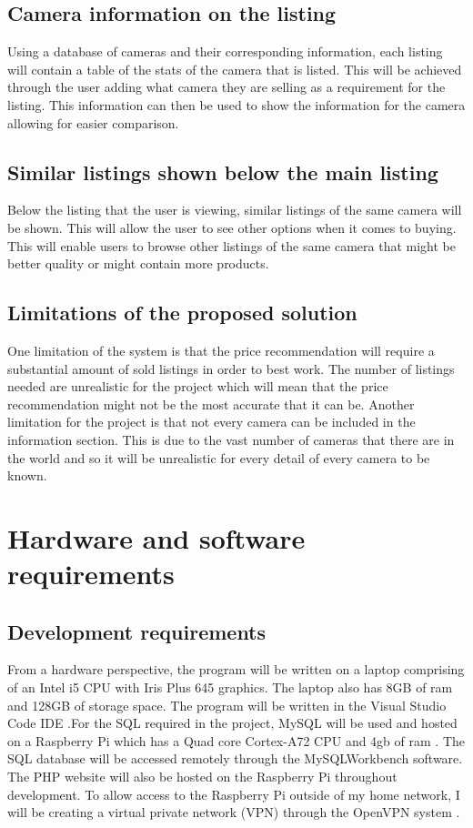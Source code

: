 \subsection{Camera information on the listing}
Using a database of cameras and their corresponding information, each listing will contain a table of the stats of the camera that is listed. This will be achieved through the user adding what camera they are selling as a requirement for the listing. This information can then be used to show the information for the camera allowing for easier comparison.
\subsection{Similar listings shown below the main listing}
Below the listing that the user is viewing, similar listings of the same camera will be shown. This will allow the user to see other options when it comes to buying. This will enable users to browse other listings of the same camera that might be better quality or might contain more products.
\subsection{Limitations of the proposed solution}
One limitation of the system is that the price recommendation will require a substantial amount of sold listings in order to best work. The number of listings needed are unrealistic for the project which will mean that the price recommendation might not be the most accurate that it can be. 
Another limitation for the project is that not every camera can be included in the information section. This is due to the vast number of cameras that there are in the world and so it will be unrealistic for every detail of every camera to be known. 

\section{Hardware and software requirements}
\subsection{Development requirements}
From a hardware perspective, the program will be written on a laptop comprising of an Intel i5 CPU with Iris Plus 645 graphics. The laptop also has 8GB of ram and 128GB of storage space. The program will be written in the Visual Studio Code IDE \parencite{visualstudio}.For the SQL required in the project, MySQL \parencite{mysql} will be used and hosted on a Raspberry Pi which has a Quad core Cortex-A72 CPU and 4gb of ram \parencite{raspberry_pi}. The SQL database will be accessed remotely through the MySQLWorkbench \parencite{mysql_workbench} software. The PHP website will also be hosted on the Raspberry Pi throughout development. To allow access to the Raspberry Pi outside of my home network, I will be creating a virtual private network (VPN) through the OpenVPN system \parencite{openvpn}. 

